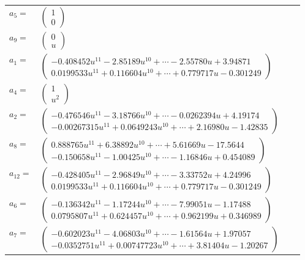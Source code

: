 \documentclass[1p]{elsarticle_modified}
\theoremstyle{definition}
\begin{document}
\begin{tabular}{m{7pt} m{180pt} m{7pt} m{180pt} }
\flushright $a_{5}=$&$\begin{pmatrix}1\\0\end{pmatrix}$ \\
\flushright $a_{9}=$&$\begin{pmatrix}0\\u\end{pmatrix}$ \\
\flushright $a_{1}=$&$\begin{pmatrix}-0.408452 u^{11}-2.85189 u^{10}+\cdots-2.55780 u+3.94871\\0.0199533 u^{11}+0.116604 u^{10}+\cdots+0.779717 u-0.301249\end{pmatrix}$ \\
\flushright $a_{4}=$&$\begin{pmatrix}1\\u^2\end{pmatrix}$ \\
\flushright $a_{2}=$&$\begin{pmatrix}-0.476546 u^{11}-3.18766 u^{10}+\cdots-0.0262394 u+4.19174\\-0.00267315 u^{11}+0.0649243 u^{10}+\cdots+2.16980 u-1.42835\end{pmatrix}$ \\
\flushright $a_{8}=$&$\begin{pmatrix}0.888765 u^{11}+6.38892 u^{10}+\cdots+5.61669 u-17.5644\\-0.150658 u^{11}-1.00425 u^{10}+\cdots-1.16846 u+0.454089\end{pmatrix}$ \\
\flushright $a_{12}=$&$\begin{pmatrix}-0.428405 u^{11}-2.96849 u^{10}+\cdots-3.33752 u+4.24996\\0.0199533 u^{11}+0.116604 u^{10}+\cdots+0.779717 u-0.301249\end{pmatrix}$ \\
\flushright $a_{6}=$&$\begin{pmatrix}-0.136342 u^{11}-1.17244 u^{10}+\cdots-7.99051 u-1.17488\\0.0795807 u^{11}+0.624457 u^{10}+\cdots+0.962199 u+0.346989\end{pmatrix}$ \\
\flushright $a_{7}=$&$\begin{pmatrix}-0.602023 u^{11}-4.06803 u^{10}+\cdots-1.61564 u+1.97057\\-0.0352751 u^{11}+0.00747723 u^{10}+\cdots+3.81404 u-1.20267\end{pmatrix}$ \\

\end{tabular}
\end{document}
